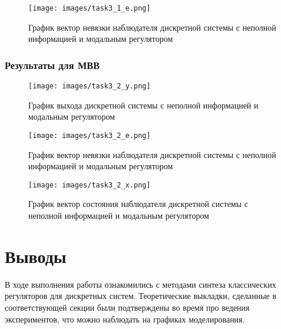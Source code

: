 \documentclass[a4paper, 14pt]{extarticle}
\theoremstyle{definition}
\theoremstyle{plain}
\theoremstyle{remark}
\begin{document}
\begin{figure}
	[H]
	\centering
	\texttt{[image: images/task3\_1\_e.png]}
	\caption{График вектор невязки наблюдателя дискретной системы с неполной информацией и модальным регулятором}
	\label{fig:task3_1_e}
\end{figure}

\subsubsection{Результаты для МВВ}
\begin{figure}
	[H]
	\centering
	\texttt{[image: images/task3\_2\_y.png]}
	\caption{График выхода дискретной системы с неполной информацией и модальным регулятором}
	\label{fig:task3_2_y}
\end{figure}

\begin{figure}
	[H]
	\centering
	\texttt{[image: images/task3\_2\_e.png]}
	\caption{График вектор невязки наблюдателя дискретной системы с неполной информацией и модальным регулятором}
	\label{fig:task3_2_e}
\end{figure}

\begin{figure}
	[H]
	\centering
	\texttt{[image: images/task3\_2\_x.png]}
	\caption{График вектор состояния наблюдателя дискретной системы с неполной информацией и модальным регулятором}
	\label{fig:task3_2_x}
\end{figure}




\newpage
\section{Выводы}
В ходе выполнения работы ознакомились с методами синтеза классических регуляторов для дискретных систем. Теоретические выкладки, сделанные в соответствующей секции были подтверждены во время про ведения экспериментов, что можно наблюдать на графиках моделирования.
\end{document}
